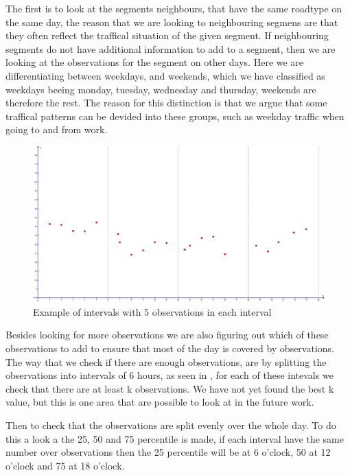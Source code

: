 The first is to look at the segments neighbours, that have the same roadtype on the same day, the reason that we are looking to neighbouring segmens are that they often reflect the traffical situation of the given segment. If neighbouring segments do not have additional information to add to a segment, then we are looking at the observations for the segment on other days. Here we are differentiating between weekdays, and weekends, which we have classified as weekdays beeing monday, tuesday, wednesday and thursday, weekends are therefore the rest. The reason for this distinction is that we argue that some traffical patterns can be devided into these groups, such as weekday traffic when going to and from work.

\begin{figure}
\centering
\includegraphics[width=\textwidth]{figures/intervals.png}
\caption{Example of intervals with 5 observations in each interval}
\label{fig:intervals}
\end{figure}

Besides looking for more observations we are also figuring out which of these observations to add to ensure that most of the day is covered by observations. The way that we check if there are enough observations, are by splitting the observations into intervals of 6 hours, as seen in , for each of these intevals we check that there are at least k observations. We have not yet found the best k value, but this is one area that are possible to look at in the future work.

Then to check that the observations are split evenly over the whole day. To do this a look a the 25, 50 and 75 percentile is made, if each interval have the same number over observations then the 25 percentile will be at 6 o'clock, 50 at 12 o'clock and 75 at 18 o'clock.

